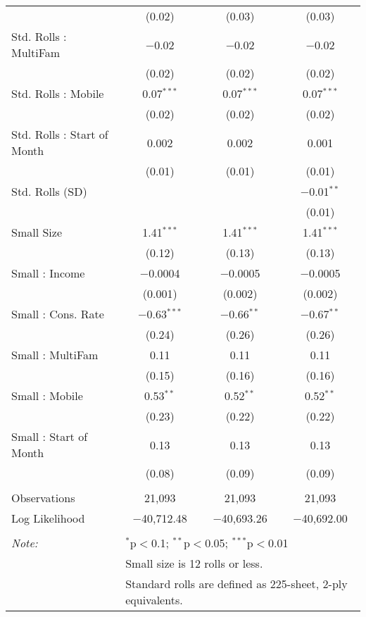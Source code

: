 \begin{table}[!htbp]
\begin{tabular}{@{\extracolsep{5pt}}lccc}
  & (0.02) & (0.03) & (0.03) \\ 
  Std. Rolls : MultiFam & $-$0.02 & $-$0.02 & $-$0.02 \\ 
  & (0.02) & (0.02) & (0.02) \\ 
  Std. Rolls : Mobile & 0.07$^{***}$ & 0.07$^{***}$ & 0.07$^{***}$ \\ 
  & (0.02) & (0.02) & (0.02) \\ 
  Std. Rolls : Start of Month & 0.002 & 0.002 & 0.001 \\ 
  & (0.01) & (0.01) & (0.01) \\ 
  Std. Rolls (SD) &  &  & $-$0.01$^{**}$ \\ 
  &  &  & (0.01) \\ 
  Small Size & 1.41$^{***}$ & 1.41$^{***}$ & 1.41$^{***}$ \\ 
  & (0.12) & (0.13) & (0.13) \\ 
  Small : Income & $-$0.0004 & $-$0.0005 & $-$0.0005 \\ 
  & (0.001) & (0.002) & (0.002) \\ 
  Small : Cons. Rate & $-$0.63$^{***}$ & $-$0.66$^{**}$ & $-$0.67$^{**}$ \\ 
  & (0.24) & (0.26) & (0.26) \\ 
  Small : MultiFam & 0.11 & 0.11 & 0.11 \\ 
  & (0.15) & (0.16) & (0.16) \\ 
  Small : Mobile & 0.53$^{**}$ & 0.52$^{**}$ & 0.52$^{**}$ \\ 
  & (0.23) & (0.22) & (0.22) \\ 
  Small : Start of Month & 0.13 & 0.13 & 0.13 \\ 
  & (0.08) & (0.09) & (0.09) \\ 
 \hline \\[-1.8ex] 
Observations & 21,093 & 21,093 & 21,093 \\ 
Log Likelihood & $-$40,712.48 & $-$40,693.26 & $-$40,692.00 \\ 
\hline 
\hline \\[-1.8ex] 
\textit{Note:}  & \multicolumn{3}{l}{$^{*}$p$<$0.1; $^{**}$p$<$0.05; $^{***}$p$<$0.01} \\ 
 & \multicolumn{3}{l}{Small size is 12 rolls or less.} \\ 
 & \multicolumn{3}{l}{Standard rolls are defined as 225-sheet, 2-ply equivalents.} \\ 
\end{tabular} 
\end{table} 

